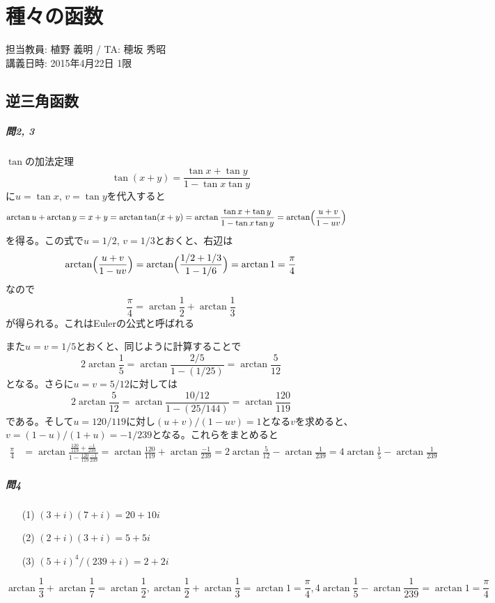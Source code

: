 \chapter{種々の函数}

\begin{flushright}
担当教員: 植野 義明 / TA: 穂坂 秀昭 \\
講義日時: 2015年4月22日 1限
\end{flushright}

\section{逆三角函数}

\paragraph{問2, 3} $\tan$の加法定理
\[
\tan(x+y) = \frac{\tan x + \tan y}{1 - \tan x\tan y}
\]
に$u=\tan x$, $v=\tan y$を代入すると
\begin{align*}
\arctan u + \arctan y
&= x + y = \arctan \tan(x+y)
= \arctan \frac{\tan x + \tan y}{1 - \tan x\tan y}
= \arctan \Bigl(\frac{u+v}{1-uv}\Bigr)
\end{align*}
を得る。この式で$u=1/2$, $v=1/3$とおくと、右辺は
\[
\arctan \Bigl(\frac{u+v}{1-uv}\Bigr) = \arctan \Bigl(\frac{1/2+1/3}{1-1/6}\Bigr) = \arctan 1 = \frac{\pi}{4}
\]
なので
\[
\frac{\pi}{4} = \arctan \frac{1}{2} + \arctan \frac{1}{3}
\]
が得られる。これはEulerの公式と呼ばれる

また$u=v=1/5$とおくと、同じように計算することで
\[
2\arctan\frac{1}{5} = \arctan\frac{2/5}{1-(1/25)} = \arctan\frac{5}{12}
\]
となる。さらに$u=v=5/12$に対しては
\[
2\arctan\frac{5}{12} = \arctan\frac{10/12}{1-(25/144)} = \arctan\frac{120}{119}
\]
である。そして$u=120/119$に対し$(u+v)/(1-uv)=1$となる$v$を求めると、$v=(1-u)/(1+u)=-1/239$となる。これらをまとめると
\begin{align*}
\frac{\pi}{4}
&= \arctan \frac{\frac{120}{119}+\frac{-1}{239}}{1-\frac{120}{119}\frac{-1}{239}}
= \arctan \frac{120}{119} + \arctan\frac{-1}{239}
= 2\arctan\frac{5}{12} - \arctan\frac{1}{239}
= 4\arctan\frac{1}{5} - \arctan\frac{1}{239}
\end{align*}

\paragraph{問4}
\begin{enumerate}
\item[(1)] $(3+i)(7+i) = 20+10i$
\item[(2)] $(2+i)(3+i) = 5+5i$
\item[(3)] $(5+i)^4/(239+i) = 2+2i$
\end{enumerate}
\[
\arctan\frac{1}{3} + \arctan\frac{1}{7} = \arctan\frac{1}{2},
\arctan\frac{1}{2} + \arctan\frac{1}{3} = \arctan{1} = \frac{\pi}{4},
4\arctan\frac{1}{5} - \arctan\frac{1}{239} = \arctan{1} = \frac{\pi}{4}
\]

